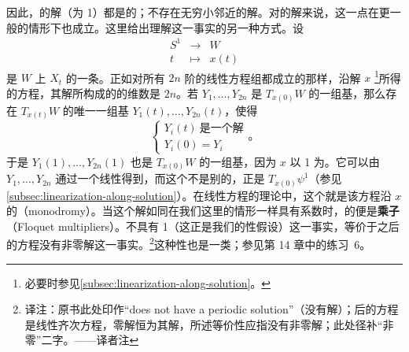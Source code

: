 \begin{remark}\label{thm:monodromy-floquet-multipliers}
因此，\trNondegenerate{}的\trStationary\trPeriodic{}解（\trPeriodic{}为 1）都是\trIsolated{}的；不存在无穷小邻近的\trPeriodic{}解。对\trNondegenerate{}的解来说，这一点在更一般的情形下也成立。这里给出理解这一事实的另一种方式。设
\[
\begin{array}{rcl}
S^1 &\longrightarrow& W\\
t &\longmapsto& x(t)
\end{array}
\]
是 $W$ 上\trVectorField{} $X_t$ 的一条\trPeriodic\trTrajectory。正如对所有 $2n$ 阶的线性\trDifferential{}方程组都成立的那样，沿解 $x$ \trLinearization{}\footnote{必要时参见\cref{subsec:linearization-along-solution}。}所得的\trDifferential{}方程，其解所构成的\trVectorSpace{}的维数是 $2n$。若 $Y_1,\dotsc,Y_{2n}$ 是 $T_{x(0)}W$ 的一组基，那么存在 $T_{x(t)}W$ 的唯一一组基 $Y_1(t),\dotsc,Y_{2n}(t)$，使得
\[
\begin{cases}
Y_i(t)\ \text{是一个解}\\
Y_i(0)=Y_i
\end{cases}\text{。}
\]
于是 $Y_1(1),\dotsc,Y_{2n}(1)$ 也是 $T_{x(0)}W$ 的一组基，因为 $x$ 以 1 为\trPeriodic。它可以由 $Y_1,\dotsc,Y_{2n}$ 通过一个线性\trIsomorphism{}得到，而这个\trIsomorphism{}不是别的，正是 $T_{x(0)}\psi^1$（参见\cref{subsec:linearization-along-solution}）。在线性\trDifferential{}方程的理论中，这个\trIsomorphism{}就是该方程沿\trTrajectory{} $x$ 的\textbf{\trMonodromy}（monodromy）。当这个解如同在我们这里的情形一样具有\trPeriodic{}系数时，\trMonodromy{}的\trEigenvalue{}便是\textbf{\trFloquet{}乘子}（Floquet multipliers）。\trMonodromy{}不具有\trEigenvalue{} 1（这正是我们的\trNondegenerate{}性假设）这一事实，等价于\trLinearization{}之后的方程没有非零\trPeriodic{}解这一事实。\footnote{译注：原书此处印作“does not have a periodic solution”（没有\trPeriodic{}解）；\trLinearization{}后的方程是线性齐次方程，零解恒为其解，所述等价性应指没有非零\trPeriodic{}解；此处径补“非零”二字。——译者注}这种\trNondegenerate{}性也是一类\trTransversality；参见第 14 章中的练习~6。
\end{remark}
